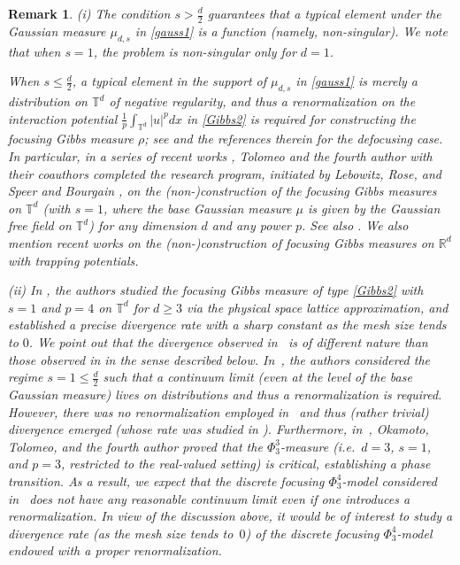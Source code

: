 \documentclass[letterpaper, 11pt,  reqno]{amsart}
\newtheorem{remark}[theorem]{Remark}
\newcommand{\noi}{\noindent}
\newcommand{\R}{\mathbb{R}}
\newcommand{\T}{\mathbb{T}}
\numberwithin{equation}{section}
\numberwithin{theorem}{section}
\begin{document}
\begin{remark}\rm
(i) The condition $s > \frac d2$
guarantees that a typical element under the Gaussian measure $\mu_{d, s}$
in \eqref{gauss1}
is  a function (namely, non-singular).
We note that when $s = 1$, 
the problem is non-singular only for 
$d = 1$.



When 
 $s \leq \frac{d}{2}$, 
a typical element in the support of $\mu_{d,s}$ in \eqref{gauss1} is merely a distribution
on $\T^d$ of negative regularity, 
and thus a 
renormalization on the interaction potential $\frac{1}{p} \int_{\mathbb{T}^d} |u|^p dx$
in \eqref{Gibbs2}
is required for constructing the focusing Gibbs measure $\rho$;
see
 \cite{BS96, OOT, OST, OOT21, GOTT}
 and the references therein for the defocusing case.
In particular, in a series
of recent works \cite{OST1, OOT, OST, OOT21, GOTT}, 
Tolomeo and the fourth author with their coauthors
completed the research program, 
initiated by Lebowitz, Rose, and Speer \cite{LRS}
and Bourgain \cite{BO94}, 
on the (non-)construction of the focusing Gibbs measures
on $\T^d$
(with $s = 1$, where the base Gaussian measure
$\mu$ is given by the Gaussian free field on $\T^d$)
for any dimension $d$ and any power $p$.
See also \cite{Nagoji, Nikov}.
We also mention recent works
\cite{RSTW22, 
DRTW, GOW}
on the (non-)construction of focusing Gibbs measures on $\R^d$
with trapping potentials.


\smallskip

\noi
(ii)
In 
\cite{CK12}, the authors
studied the focusing Gibbs measure of type \eqref{Gibbs2}
with $s = 1$ and $p = 4$ on $\T^d$ for $d \ge 3$
via the 
 physical space lattice approximation,
 and established a precise divergence rate
 with a sharp constant
 as the mesh size tends to $0$.
We point out that the divergence observed in~\cite{CK12}
is of different nature than those observed in \cite{OST1, OOT, OST, OOT21}
in the  sense described below.
In~\cite{CK12}, the authors considered the regime $s = 1 \le \frac d2$
such that 
a  continuum limit (even at the level of the base Gaussian measure)
lives on distributions and thus a renormalization
is required. %
However, there was {\it no} renormalization employed
in~\cite{CK12} and thus (rather trivial) divergence emerged %
(whose rate was studied in \cite{CK12}).
Furthermore, in~\cite{OOT21}, 
Okamoto, Tolomeo, and the fourth author proved that 
the $\Phi^3_3$-measure (i.e.~$d = 3$, $s = 1$, and $p = 3$, restricted
to the real-valued setting) is critical, establishing a phase transition.
As a result,  
we expect that the discrete focusing $\Phi^4_3$-model  considered
in~\cite{CK12} does {\it not} have any reasonable continuum limit
even if one introduces a renormalization.
In view of the discussion  above, 
it would be of interest to study 
a divergence rate (as the mesh size tends to~$0$) of 
the discrete focusing $\Phi^4_3$-model
endowed with a proper renormalization.



\end{remark}
\end{document}
